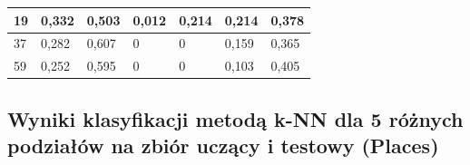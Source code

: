 \documentclass{classrep}
\begin{document}
{\begin{table}[h]
\begin{center}
\begin{tabular}{|l|l|l|l|l|l|l|}
19                                                       & 0,332                                                & 0,503                                                   & 0,012                                                    & 0,214                                                       & 0,214                                                   & 0,378                                                      \\ \hline
37                                                       & 0,282                                                & 0,607                                                   & 0                                                        & 0                                                           & 0,159                                                   & 0,365                                                      \\ \hline
59                                                       & 0,252                                                & 0,595                                                   & 0                                                        & 0                                                           & 0,103                                                   & 0,405                                                      \\ \hline
\end{tabular}
\end{center}
\end{table}

\subsection{Wyniki klasyfikacji metodą k-NN dla 5 różnych podziałów na zbiór uczący i testowy (Places)}

}
\end{document}
